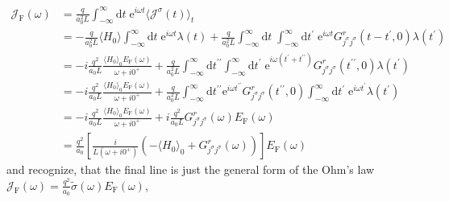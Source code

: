 \begin{align}
    \mathcal{J}_{\text{F} }(\omega ) & = \frac{q}{a_0^2 L} \int_{-\infty}^{\infty } \mathrm{d} t \; \mathrm{e}^{i \omega t} \langle \mathcal{J}^{\sigma }(t) \rangle_t \nonumber                                                                                                            \\
                                     & = - \frac{q}{a_0^2 L}\langle H_0 \rangle  \int_{-\infty}^{\infty } \mathrm{d} t \; \mathrm{e}^{i \omega t} \lambda (t)
    + \frac{q}{a_0^2 L} \int_{-\infty }^{\infty } \mathrm{d}t \; \int_{-\infty }^{\infty } \mathrm{d} t^{\prime} \; \mathrm{e}^{i \omega t} G^r_{j^{\sigma }j^{\sigma}}(t-t^{\prime},0 ) \lambda (t^{\prime} ) \nonumber                                                                    \\
                                     & = -i \frac{q^2}{a_0 L} \frac{\langle H_0 \rangle_0 E_{\text{F} }(\omega )}{\omega + i 0^{+}  }
    + \frac{q}{a_0^2 L} \int_{-\infty }^{\infty } \mathrm{d}t^{\prime\prime} \int_{-\infty }^{\infty } \mathrm{d} t^{\prime} \; \mathrm{e}^{i \omega (t^{\prime} + t^{\prime\prime}) } G^r_{j^{\sigma }j^{\sigma}}(t^{\prime\prime},0 ) \lambda (t^{\prime} ) \nonumber                     \\
                                     & = -i \frac{q^2}{a_0 L} \frac{\langle H_0 \rangle_0 E_{\text{F} }(\omega )}{\omega + i 0^{+}  }
    + \frac{q}{a_0^2 L} \int_{-\infty }^{\infty } \mathrm{d}t^{\prime\prime} \mathrm{e}^{i \omega  t^{\prime\prime} } G^r_{j^{\sigma }j^{\sigma}}(t^{\prime\prime},0 ) \int_{-\infty }^{\infty } \mathrm{d} t^{\prime} \; \mathrm{e}^{i \omega t^{\prime} } \lambda (t^{\prime} ) \nonumber \\
                                     & = -i \frac{q^2}{a_0 L} \frac{\langle H_0 \rangle_0 E_{\text{F} }(\omega )}{\omega + i 0^{+}  }
    + i\frac{q^2}{a_0 L} G^r_{j^{\sigma }j^{\sigma}}(\omega) E_{\text{F} }(\omega ) \nonumber                                                                                                                                                                                               \\
                                     & = \frac{q^2}{a_0} \left[\frac{i}{L(\omega +i 0^{+} )} \left(- \langle H_0 \rangle_0 + G^r_{j^{\sigma }j^{\sigma }}(\omega ) \right)  \right] E_{\text{F} }(\omega )
\end{align}
and recognize, that the final line is just the general form of the Ohm's law \(\mathcal{J}_{\text{F} }(\omega ) = \frac{q^2}{a_0}\tilde{\sigma}(\omega)E_{\text{F} }(\omega )\),

